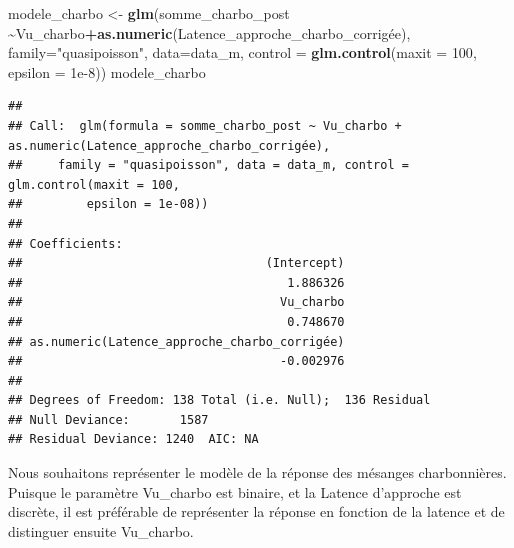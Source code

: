 \documentclass[
  french,
]{article}
\newenvironment{Shaded}{\begin{snugshade}}{\end{snugshade}}
\newcommand{\AttributeTok}[1]{\textcolor[rgb]{0.13,0.29,0.53}{#1}}
\newcommand{\DecValTok}[1]{\textcolor[rgb]{0.00,0.00,0.81}{#1}}
\newcommand{\FloatTok}[1]{\textcolor[rgb]{0.00,0.00,0.81}{#1}}
\newcommand{\FunctionTok}[1]{\textcolor[rgb]{0.13,0.29,0.53}{\textbf{#1}}}
\newcommand{\NormalTok}[1]{#1}
\newcommand{\OtherTok}[1]{\textcolor[rgb]{0.56,0.35,0.01}{#1}}
\newcommand{\SpecialCharTok}[1]{\textcolor[rgb]{0.81,0.36,0.00}{\textbf{#1}}}
\newcommand{\StringTok}[1]{\textcolor[rgb]{0.31,0.60,0.02}{#1}}
\begin{document}
\begin{Shaded}
\begin{Highlighting}[]
\NormalTok{modele\_charbo }\OtherTok{\textless{}{-}} \FunctionTok{glm}\NormalTok{(somme\_charbo\_post }\SpecialCharTok{\textasciitilde{}}\NormalTok{Vu\_charbo}\SpecialCharTok{+}\FunctionTok{as.numeric}\NormalTok{(Latence\_approche\_charbo\_corrigée), }\AttributeTok{family=}\StringTok{"quasipoisson"}\NormalTok{, }\AttributeTok{data=}\NormalTok{data\_m, }
            \AttributeTok{control =} \FunctionTok{glm.control}\NormalTok{(}\AttributeTok{maxit =} \DecValTok{100}\NormalTok{, }\AttributeTok{epsilon =} \FloatTok{1e{-}8}\NormalTok{))}
\NormalTok{modele\_charbo}
\end{Highlighting}
\end{Shaded}

\begin{verbatim}
## 
## Call:  glm(formula = somme_charbo_post ~ Vu_charbo + as.numeric(Latence_approche_charbo_corrigée), 
##     family = "quasipoisson", data = data_m, control = glm.control(maxit = 100, 
##         epsilon = 1e-08))
## 
## Coefficients:
##                                  (Intercept)  
##                                     1.886326  
##                                    Vu_charbo  
##                                     0.748670  
## as.numeric(Latence_approche_charbo_corrigée)  
##                                    -0.002976  
## 
## Degrees of Freedom: 138 Total (i.e. Null);  136 Residual
## Null Deviance:       1587 
## Residual Deviance: 1240  AIC: NA
\end{verbatim}

Nous souhaitons représenter le modèle de la réponse des mésanges
charbonnières. Puisque le paramètre Vu\_charbo est binaire, et la
Latence d'approche est discrète, il est préférable de représenter la
réponse en fonction de la latence et de distinguer ensuite Vu\_charbo.
\end{document}
